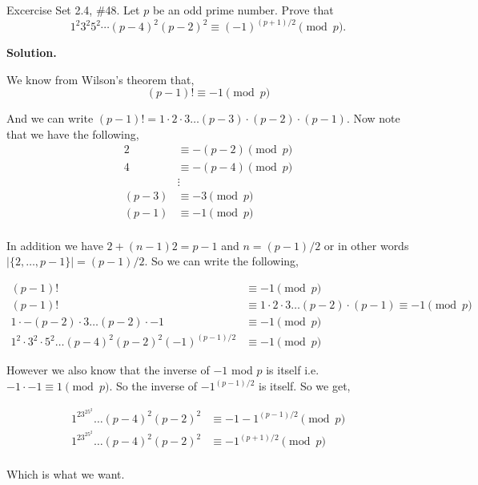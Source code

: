 \documentclass[12pt]{exam}
\begin{document}
\begin{questions}
\newpage 
\question  Excercise Set 2.4, \#48.
Let $p$ be an odd prime number. Prove that 
\begin{equation*}
1^2 3^2 5^2 \cdots (p-4)^2 (p-2)^2 \equiv (-1)^{(p+1)/2} \pmod{p}.
\end{equation*}

\textbf{Solution.}

We know from Wilson's theorem that, 
$$
(p - 1)! \equiv -1 \pmod p
$$


And we can write $(p - 1)! = 1 \cdot 2 \cdot 3 \dots (p - 3) \cdot (p - 2) \cdot (p - 1)$. Now note that we have the following,
\begin{align*}
	2 & \equiv -(p - 2) \pmod p\\
	4 & \equiv -(p - 4) \pmod p\\
	  & \vdots\\
	(p - 3) & \equiv -3 \pmod p\\
	(p - 1) & \equiv -1 \pmod p\\
\end{align*}

In addition we have $2 + (n - 1)2 = p - 1$  and $n = (p - 1) / 2$ or in other words $|\{2, \dots, p - 1\}| = (p - 1) /2$. So we can write the following,


\begin{align*}
	(p - 1)! &\equiv -1 \pmod p\\
	(p - 1)! &\equiv 1 \cdot 2 \cdot 3 \dots (p - 2) \cdot (p - 1) \equiv -1 \pmod p\\
	1 \cdot -(p - 2)\cdot 3 \dots (p - 2) \cdot -1 &\equiv -1 \pmod p\\
	1^2 \cdot  3^2 \cdot 5^2 \dots (p - 4)^2 (p - 2)^2 (-1)^{(p - 1) / 2} &\equiv -1 \pmod p
\end{align*}	

However we also know that the inverse of $-1$ mod $p$ is itself i.e. $-1 \cdot -1 \equiv 1 \pmod p$. So the inverse of $-1^{(p - 1) / 2}$ is itself. So we get,

\begin{align*}
	1^23^25^2 \dots (p - 4)^2 (p - 2)^2 &\equiv -1 -1^{(p - 1)  /2} \pmod p\\
	1^23^25^2 \dots (p - 4)^2 (p - 2)^2 &\equiv -1^{(p + 1)  /2} \pmod p\\
\end{align*}

Which is what we want.


 

 

\end{questions}
\end{document}

